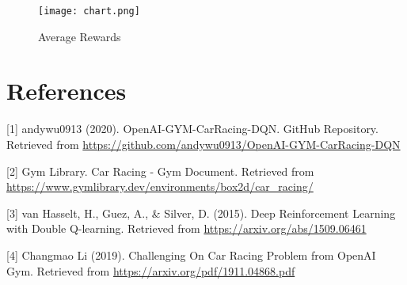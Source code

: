 \documentclass{article}
\begin{document}
\clearpage  %

\begin{figure}[!h]
  \centering
  \texttt{[image: chart.png]}
  \caption{Average Rewards}
  \label{figure}
\end{figure}

\section*{References}

\small

[1] andywu0913 (2020). OpenAI-GYM-CarRacing-DQN. GitHub Repository. Retrieved from \url{https://github.com/andywu0913/OpenAI-GYM-CarRacing-DQN}

[2] Gym Library. Car Racing - Gym Document. Retrieved from \url{https://www.gymlibrary.dev/environments/box2d/car_racing/}

[3] van Hasselt, H., Guez, A., \& Silver, D. (2015). Deep Reinforcement Learning with Double Q-learning. Retrieved from \url{https://arxiv.org/abs/1509.06461}

[4] Changmao Li (2019). Challenging On Car Racing Problem from OpenAI Gym.
Retrieved from \url{https://arxiv.org/pdf/1911.04868.pdf}
\end{document}
